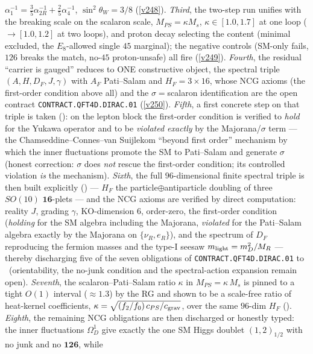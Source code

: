 \documentclass[11pt,a4paper]{article}
\begin{document}
\begin{keybox}
$\alpha_1^{-1}=\tfrac35\alpha_{2R}^{-1}+\tfrac25\alpha_4^{-1}$, $\sin^2\theta_W=3/8$ (\vref{v248}).
\emph{Third}, the two-step run unifies with the breaking scale on the scalaron scale, $M_{PS}=\kappa M_s$,
$\kappa\in[1.0,1.7]$ at one loop ($\to[1.0,1.2]$ at two loops), and proton decay selecting the content
(minimal excluded, the $E_8$-allowed single $45$ marginal); the negative controls (SM-only fails, $126$
breaks the match, no-$45$ proton-unsafe) all fire (\vref{v249}). \emph{Fourth}, the residual ``carrier is
gauged'' reduces to ONE constructive object, the spectral triple $(A,H,D_F,J,\gamma)$ with $A_F$
Pati--Salam and $H_F=3{\times}16$, whose NCG axioms (the first-order condition above all) and the
$\sigma=$scalaron identification are the open contract \texttt{CONTRACT.QFT4D.DIRAC.01} (\vref{v250}).
\emph{Fifth}, a first concrete step on that triple is taken (): on the
lepton block the first-order condition is verified to \emph{hold} for the Yukawa operator and to be
\emph{violated exactly} by the Majorana/$\sigma$ term --- the Chamseddine--Connes--van Suijlekom ``beyond
first order'' mechanism by which the inner fluctuations promote the SM to Pati--Salam and generate $\sigma$
(honest correction: $\sigma$ does \emph{not} rescue the first-order condition; its controlled violation
\emph{is} the mechanism).
\emph{Sixth}, the full $96$-dimensional finite spectral triple is then built explicitly
() --- $H_F$ the particle$\oplus$antiparticle doubling of three $SO(10)$
$\mathbf{16}$-plets --- and the NCG axioms are verified by direct computation: reality $J$, grading $\gamma$,
KO-dimension $6$, order-zero, the first-order condition (\emph{holding} for the SM algebra including the
Majorana, \emph{violated} for the Pati--Salam algebra exactly by the Majorana on $\{\nu_R,e_R\}$), and the
spectrum of $D_F$ reproducing the fermion masses and the type-I seesaw $m_{\rm light}=m_D^2/M_R$ --- thereby
discharging five of the seven obligations of \texttt{CONTRACT.QFT4D.DIRAC.01} to \mE\ (orientability, the
no-junk condition and the spectral-action expansion remain open).
\emph{Seventh}, the scalaron--Pati--Salam ratio $\kappa$ in $M_{PS}=\kappa\,M_s$ is pinned to a tight $O(1)$
interval ($\approx1.3$) by the RG and shown to be a scale-free ratio of heat-kernel coefficients,
$\kappa=\sqrt{(f_2/f_0)\,c_{PS}/c_{\rm grav}}$, over the same $96$-dim $H_F$ ().
\emph{Eighth}, the remaining NCG obligations are then discharged or honestly typed: the inner fluctuations
$\Omega^1_D$ give exactly the one SM Higgs doublet $(1,2)_{1/2}$ with no junk and no $\mathbf{126}$, while

\end{keybox}
\end{document}
